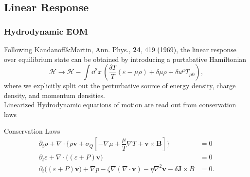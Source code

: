 \documentclass[10pt,aspectratio=43,xcolor=x11names,t]{beamer}%
\begin{document}
	\subsection{Linear Response}
		\begin{frame}\frametitle{Hydrodynamic EOM}
			Following {\scriptsize Kandanoff\&Martin, Ann. Phys., \textbf{24}, 419 (1969)}, the linear response over equilibrium state can be obtained by introducing a purtabative Hamiltonian
			\begin{equation*}
				\mathcal{H}\rightarrow\mathcal{H}-\int\dd^{2}x\,\left(\dfrac{\delta T}{T}(\varepsilon-\mu\rho)+\delta \mu\rho+\delta u^\mu T_{\mu0}\right),
			\end{equation*}
			where we explicitly split out the perturbative source of energy density, charge density, and momentum densities.\\
			\pause
			Linearized Hydrodynamic equations of motion are read out from conservation laws
			\begin{block}{Conservation Laws}
				\begin{align*}
					\partial_t\rho+\nabla\cdot\bigg\{\rho\bm{v}+\sigma_Q\left[-\nabla\mu+\dfrac{\mu}{T}\nabla T+\bm{v}\times\bm{B}\right]\bigg\}&=0\\
					\partial_t\varepsilon+\nabla\cdot\bigg((\varepsilon+P)\bm{v}\bigg)&=0\\
					\partial_t\bigg((\varepsilon+P)\bm{v}\bigg)+\nabla p-\zeta\nabla(\nabla\cdot\bm{v})-\eta\nabla^2\bm{v}-\delta\bm{J}\times B&=0.
				\end{align*}
			\end{block}
		\end{frame}
\end{document}
